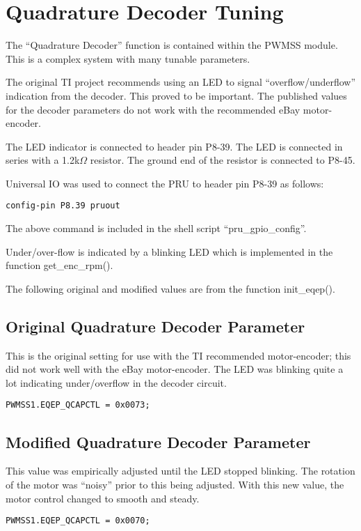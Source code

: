 \section{Quadrature Decoder Tuning}

The ``Quadrature Decoder'' function is contained within the PWMSS module.  This is a complex system with many tunable parameters.

The original TI project recommends using an LED to signal ``overflow/underflow'' indication from the decoder.  This proved to be important.  The published values for the decoder parameters do not work with the recommended eBay motor-encoder.

The LED indicator is connected to header pin P8-39.  The LED is connected in series with a 1.2k$\Omega$ resistor.  The ground end of the resistor is connected to P8-45.

Universal IO was used to connect the PRU to header pin P8-39 as follows:

\begin{verbatim}
config-pin P8.39 pruout
\end{verbatim}

The above command is included in the shell script ``pru\_gpio\_config''.

Under/over-flow is indicated by a blinking LED which is implemented in the function get\_enc\_rpm().

The following original and modified values are from the function init\_eqep().

\subsection{Original Quadrature Decoder Parameter}

This is the original setting for use with the TI recommended motor-encoder; this did not work well with the eBay motor-encoder.  The LED was blinking quite a lot indicating under/overflow in the decoder circuit.

\begin{verbatim}
PWMSS1.EQEP_QCAPCTL = 0x0073;
\end{verbatim}

\subsection{Modified Quadrature Decoder Parameter}
    
This value was empirically adjusted until the LED stopped blinking.
The rotation of the motor was ``noisy'' prior to this being adjusted.
With this new value, the motor control changed to smooth and steady.
    
\begin{verbatim}
PWMSS1.EQEP_QCAPCTL = 0x0070;
\end{verbatim}

